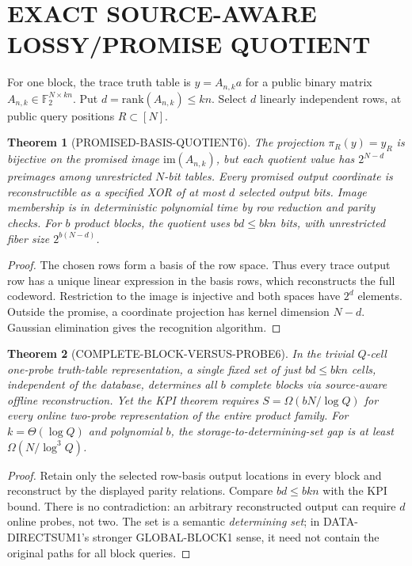 \documentclass[11pt]{article}
\newtheorem{theorem}{Theorem}
\begin{document}
\section{EXACT SOURCE-AWARE LOSSY/PROMISE QUOTIENT}
For one block, the trace truth table is $y=A_{n,k}a$ for a public binary matrix $A_{n,k}\in\mathbb F_2^{N\times kn}$. Put $d=\mathrm{rank}(A_{n,k})\le kn$. Select $d$ linearly independent rows, at public query positions $R\subset[N]$.

\begin{theorem}[PROMISED-BASIS-QUOTIENT6]
The projection $\pi_R(y)=y_R$ is bijective on the promised image $\mathrm{im}(A_{n,k})$, but each quotient value has $2^{N-d}$ preimages among unrestricted $N$-bit tables. Every promised output coordinate is reconstructible as a specified XOR of at most $d$ selected output bits. Image membership is in deterministic polynomial time by row reduction and parity checks. For $b$ product blocks, the quotient uses $bd\le bkn$ bits, with unrestricted fiber size $2^{b(N-d)}$.
\end{theorem}
\begin{proof}
The chosen rows form a basis of the row space. Thus every trace output row has a unique linear expression in the basis rows, which reconstructs the full codeword. Restriction to the image is injective and both spaces have $2^d$ elements. Outside the promise, a coordinate projection has kernel dimension $N-d$. Gaussian elimination gives the recognition algorithm.
\end{proof}

\begin{theorem}[COMPLETE-BLOCK-VERSUS-PROBE6]
In the trivial $Q$-cell one-probe truth-table representation, a single fixed set of just $bd\le bkn$ cells, independent of the database, determines \emph{all} $b$ complete blocks via source-aware offline reconstruction. Yet the KPI theorem requires $S=\Omega(bN/\log Q)$ for every online two-probe representation of the entire product family. For $k=\Theta(\log Q)$ and polynomial $b$, the storage-to-determining-set gap is at least $\Omega(N/\log^3Q)$.
\end{theorem}
\begin{proof}
Retain only the selected row-basis output locations in every block and reconstruct by the displayed parity relations. Compare $bd\le bkn$ with the KPI bound. There is no contradiction: an arbitrary reconstructed output can require $d$ online probes, not two. The set is a semantic \emph{determining set}; in DATA-DIRECTSUM1's stronger GLOBAL-BLOCK1 sense, it need not contain the original paths for all block queries.
\end{proof}
\end{document}
